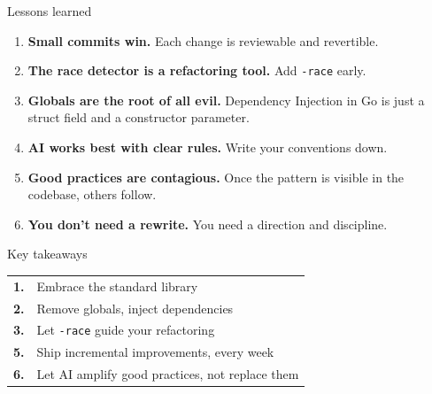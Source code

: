 \documentclass[aspectratio=169,11pt]{beamer}
\begin{document}
\begin{frame}{Lessons learned}
  \begin{enumerate}
    \setlength\itemsep{6pt}
    \item \textbf{Small commits win.}
          Each change is reviewable and revertible.
    \item \textbf{The race detector is a refactoring tool.}
          Add \texttt{-race} early.
    \item \textbf{Globals are the root of all evil.}
          Dependency Injection in Go is just a struct field and a constructor parameter.
    \item \textbf{AI works best with clear rules.}
          Write your conventions down.
    \item \textbf{Good practices are contagious.}
          Once the pattern is visible in the codebase, others follow.
    \item \textbf{You don't need a rewrite.}
          You need a direction and discipline.
  \end{enumerate}
\end{frame}

\begin{frame}{Key takeaways}
  \centering
  \vspace{10pt}
  {\large
  \begin{tabular}{rl}
    \textcolor{primary}{\textbf{1.}} & Embrace the standard library \\[8pt]
    \textcolor{primary}{\textbf{2.}} & Remove globals, inject dependencies \\[8pt]
    \textcolor{primary}{\textbf{3.}} & Let \texttt{-race} guide your refactoring \\[8pt]
    \textcolor{primary}{\textbf{5.}} & Ship incremental improvements, every week \\[8pt]
    \textcolor{primary}{\textbf{6.}} & Let AI amplify good practices, not replace them \\
  \end{tabular}
  }
\end{frame}
\end{document}
